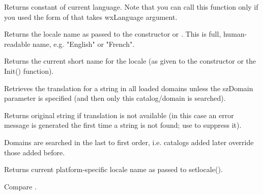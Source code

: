 \label{wxlocalegetlanguage}


Returns  constant of current language.
Note that you can call this function only if you used the form of
 that takes wxLanguage argument.


\label{wxlocalegetlocale}


Returns the locale name as passed to the constructor or 
. This is full, human-readable name,
e.g. "English" or "French".


\label{wxlocalegetname}


Returns the current short name for the locale (as given to the constructor or
the Init() function).

\label{wxlocalegetstring}


Retrieves the translation for a string in all loaded domains unless the szDomain
parameter is specified (and then only this catalog/domain is searched).

Returns original string if translation is not available
(in this case an error message is generated the first time
a string is not found; use  to suppress it).


Domains are searched in the last to first order, i.e. catalogs
added later override those added before.

\label{wxlocalegetsysname}


Returns current platform-specific locale name as passed to setlocale().

Compare .


\label{wxlocalegetsystemlanguage}


